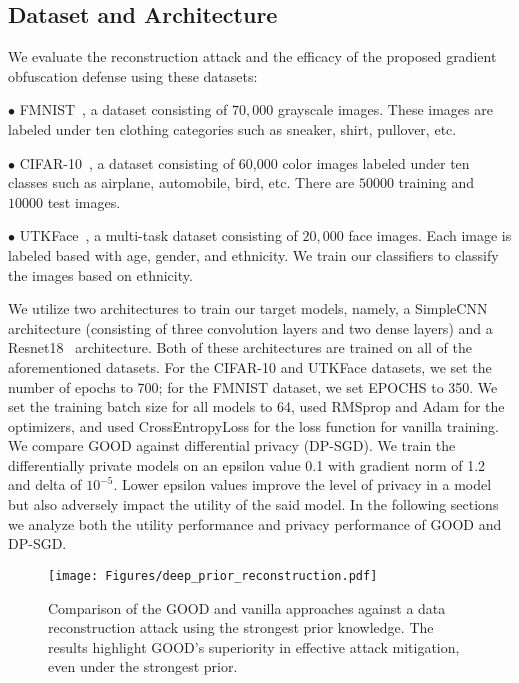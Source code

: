 \subsection{Dataset and Architecture}
We evaluate the reconstruction attack and the efficacy of the proposed gradient obfuscation defense using these datasets:

$\bullet$ {FMNIST}~\cite{FMNIST}, a dataset consisting of $70,000$ grayscale images. These images are labeled under ten clothing categories such as sneaker, shirt, pullover, etc.

$\bullet$ {CIFAR-10}~\cite{CIFAR}, a dataset consisting of 60,000 color images labeled under ten classes such as airplane, automobile, bird, etc. There are $50000$ training and $10000$ test images.

$\bullet$ {UTKFace}~\cite{UTKFace}, a multi-task dataset consisting of $20,000$ face images. Each image is labeled based with age, gender, and ethnicity. We train our classifiers to classify the images based on ethnicity.

We utilize two architectures to train our target models, namely, a SimpleCNN architecture (consisting of three convolution layers and two dense layers) and a Resnet18~\cite{resnet18} architecture. Both of these architectures are trained on all of the aforementioned datasets.
{\color{black} For the CIFAR-10 and UTKFace datasets, we set the number of epochs to 700; for the FMNIST dataset, we set EPOCHS to 350. We set the training batch size for all models to 64, used RMSprop and Adam for the optimizers, and used CrossEntropyLoss for the loss function for vanilla training.}
We compare GOOD against differential privacy (DP-SGD). We train the differentially private models on an epsilon value 0.1 with gradient norm of 1.2 and delta of $10^{-5}$. Lower epsilon values improve the level of privacy in a model but also adversely impact the utility of the said model. In the following sections we analyze both the utility performance and privacy performance of GOOD and DP-SGD. 

\begin{figure}[t]
\centering
  \texttt{[image: Figures/deep\_prior\_reconstruction.pdf]} 
  \vspace{-0.24in}
  \caption{Comparison of the GOOD and vanilla approaches against a data reconstruction attack using the strongest prior knowledge. The results highlight GOOD's superiority in effective attack mitigation, even under the strongest prior.}
  \label{fig:Reconstruction_deep_prior} 
  \vspace{-0.15in}
\end{figure}



